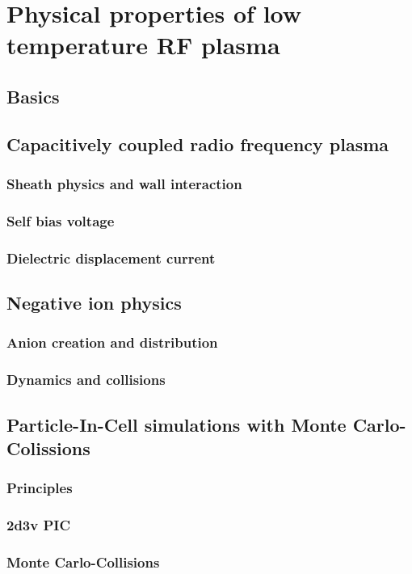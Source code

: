 \chapter{Physical properties of low temperature RF plasma}

  \section{Basics}

  \section{Capacitively coupled radio frequency plasma}

    \subsection{Sheath physics and wall interaction}

    \subsection{Self bias voltage}

    \subsection{Dielectric displacement current}

  \section{Negative ion physics}

    \subsection{Anion creation and distribution}

    \subsection{Dynamics and collisions}

  \section{Particle-In-Cell simulations with Monte Carlo-Colissions}

    \subsection{Principles}

    \subsection{2d3v PIC}

    \subsection{Monte Carlo-Collisions}

